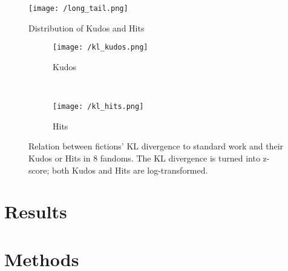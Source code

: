 \documentclass[11pt]{article} %
\begin{document}
\begin{figure}[htbp]
\begin{center}
\texttt{[image: /long\_tail.png]}
\caption{Distribution of Kudos and Hits}
\label{fig:long_tail}
\end{center}
\end{figure}


\begin{figure*}[t!]
    \centering
    \begin{subfigure}[t]{0.7\textwidth}
        \centering
        \texttt{[image: /kl\_kudos.png]}
        \caption{Kudos}
    \end{subfigure}%
    ~ 
    \begin{subfigure}[t]{0.3\textwidth}
        \centering
        \texttt{[image: /kl\_hits.png]}
        \caption{Hits}
    \end{subfigure}
    \caption{Relation between fictions' KL divergence to standard work and their Kudos or Hits in 8 fandoms. The KL divergence is turned into z-score; both Kudos and Hits are log-transformed. }
    \label{fig:kl_fields}
\end{figure*}







\section{Results} %
\label{sec:results}


\section{Methods} %
\label{sec:methods}


\printbibliography
    
\end{document}

